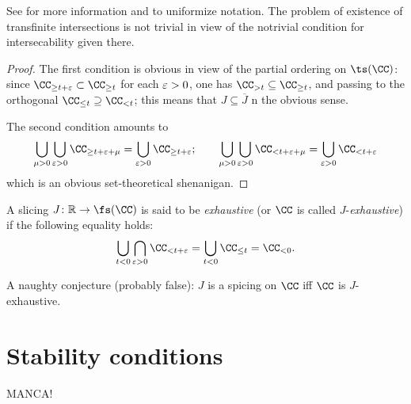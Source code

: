 See \cite{bondal2013operations} for more information and to uniformize notation. The problem of existence of transfinite intersections is not trivial in view of the notrivial condition for intersecability given there.
\begin{proof}
The first condition is obvious in view of the partial ordering on $\ts(\CC)$: since $\CC_{\ge t+\eps}\subset \CC_{\ge t}$ for each $\varepsilon > 0$, one has $\CC_{>t}\subseteq \CC_{\ge t}$, and passing to the orthogonal $\CC_{\le t}\supseteq \CC_{<t}$; this means that $J\subseteq \overline J$ n the obvious sense.

The second condition amounts to
\[
\bigcup_{\mu > 0}\bigcup_{\eps > 0} \CC_{\ge t+\eps+\mu} = 
\bigcup_{\eps > 0}\CC_{\ge t+\eps};\qquad
\bigcup_{\mu > 0}\bigcup_{\eps > 0} \CC_{< t+\eps+\mu} = 
\bigcup_{\eps > 0}\CC_{ < t+\eps}
\]
which is an obvious set\hyp{}theoretical shenanigan.
\end{proof}
\begin{definition}
A slicing $J\colon \R\to \fs(\CC)$ is said to be \emph{exhaustive} (or $\CC$ is called $J$-\emph{exhaustive}) if the following equality holds:
\[
\bigcup_{t<0}\bigcap_{\eps > 0} \CC_{< t+\eps} = \bigcup_{t<0} \CC_{\le t} = \CC_{<0}.
\]
\end{definition}
A naughty conjecture (probably false): $J$ is a spicing on $\CC$ iff $\CC$ is $J$-exhaustive.

\section{Stability conditions}
\epigraph{MANCA!}{}

